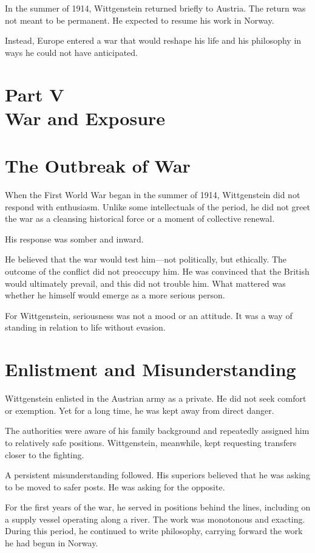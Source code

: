 \documentclass[11pt]{article}
\begin{document}
In the summer of 1914, Wittgenstein returned briefly to Austria. The return was not meant to be permanent. He expected to resume his work in Norway.

Instead, Europe entered a war that would reshape his life and his philosophy in ways he could not have anticipated.

\newpage
\section*{Part V \\ War and Exposure}

\section*{The Outbreak of War}

When the First World War began in the summer of 1914, Wittgenstein did not respond with enthusiasm. Unlike some intellectuals of the period, he did not greet the war as a cleansing historical force or a moment of collective renewal.

His response was somber and inward.

He believed that the war would test him—not politically, but ethically. The outcome of the conflict did not preoccupy him. He was convinced that the British would ultimately prevail, and this did not trouble him. What mattered was whether he himself would emerge as a more serious person.

For Wittgenstein, seriousness was not a mood or an attitude. It was a way of standing in relation to life without evasion.

\section*{Enlistment and Misunderstanding}

Wittgenstein enlisted in the Austrian army as a private. He did not seek comfort or exemption. Yet for a long time, he was kept away from direct danger.

The authorities were aware of his family background and repeatedly assigned him to relatively safe positions. Wittgenstein, meanwhile, kept requesting transfers closer to the fighting.

A persistent misunderstanding followed. His superiors believed that he was asking to be moved to safer posts. He was asking for the opposite.

For the first years of the war, he served in positions behind the lines, including on a supply vessel operating along a river. The work was monotonous and exacting. During this period, he continued to write philosophy, carrying forward the work he had begun in Norway.
\end{document}
